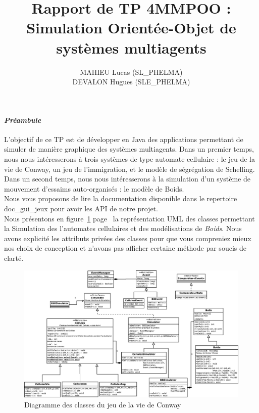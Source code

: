 \documentclass[a4paper, 10pt, french]{article}
\title{Rapport de TP 4MMPOO : Simulation Orientée-Objet de systèmes multiagents }
\author{
MAHIEU Lucas (SL\_PHELMA) 
\\ DEVALON Hugues (SLE\_PHELMA) 
}
\begin{document}
\maketitle

\paragraph{\em Préambule}
{L’objectif de ce TP est de développer en Java des applications permettant de simuler de manière graphique des systèmes multiagents. Dans un premier temps, nous nous intéresserons à trois systèmes de type automate cellulaire : le jeu de la vie de Conway, un jeu de l’immigration, et le modèle de ségrégation de Schelling. Dans un second temps, nous nous intéresserons à la simulation d’un système de mouvement d’essaims auto-organisés : le modèle de Boids.
\\Nous vous proposons de lire la documentation disponible dans le repertoire doc\_gui\_jeux pour avoir les API de notre projet.
\\Nous présentons en figure~\ref{étiquette} page~\pageref{étiquette} la représentation UML des classes permettant la Simulation des l'automates cellulaires et des modélisations de {\em Boids}. Nous avons explicité les attributs privées des classes pour que vous compreniez mieux nos choix de conception et n'avons pas afficher certaine méthode par soucis de clarté.
}
\begin{figure}[h]
\hspace{-20mm} 
	\includegraphics[scale=0.27]{UML_Cellules.eps}
	\caption{\label{étiquette} Diagramme des classes du jeu de la vie de Conway}
\end{figure}
\end{document}
